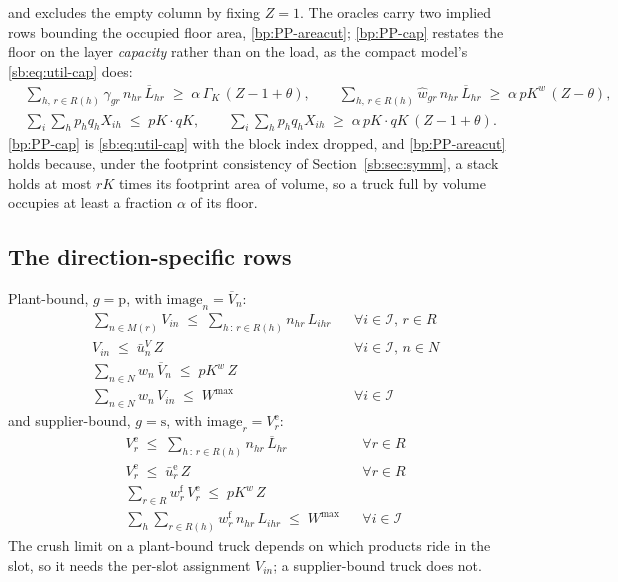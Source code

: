 and excludes the empty column by fixing $Z=1$. The oracles carry two
implied rows bounding the occupied floor area, \eqref{bp:PP-areacut};
\eqref{bp:PP-cap} restates the floor on the layer \emph{capacity}
rather than on the load, as the compact model's
\eqref{sb:eq:util-cap} does:
\begin{align}
  & \sum_{h,\,r \in R(h)} \gamma_{gr}\,n_{hr}\,\overline{L}_{hr}
      \;\ge\;\alpha\,\Gamma_{K}\,(Z-1+\theta), \qquad
    \sum_{h,\,r \in R(h)} \hat w_{gr}\,n_{hr}\,\overline{L}_{hr}
      \;\ge\;\alpha\,\mathit{pK}^{w}\,(Z-\theta),
    \label{bp:PP-cap}\\
  & \sum_{i}\sum_{h} p_{h}q_{h}X_{ih} \;\le\; \mathit{pK}\cdot\mathit{qK},
    \qquad
    \sum_{i}\sum_{h} p_{h}q_{h}X_{ih}
      \;\ge\;\alpha\,\mathit{pK}\cdot\mathit{qK}\,(Z-1+\theta).
    \label{bp:PP-areacut}
\end{align}
\eqref{bp:PP-cap} is \eqref{sb:eq:util-cap} with the block index
dropped, and \eqref{bp:PP-areacut} holds because, under the footprint
consistency of Section~\ref{sb:sec:symm}, a stack holds at most $rK$
times its footprint area of volume, so a truck full by volume occupies
at least a fraction $\alpha$ of its floor.

\subsection{The direction-specific rows}
\label{sec:pp-dir}

Plant-bound, $g=\mathrm{p}$, with $\mathrm{image}_{n}=\overline{V}_{n}$:
\begin{align}
  & \sum_{n \in M(r)} V_{in} \;\le\; \sum_{h\,:\,r \in R(h)} n_{hr}\,L_{ihr}
    && \forall i \in \mathcal{I},\, r \in R \label{bp:PP-p-slot-cap}\\
  & V_{in} \;\le\; \bar u^{V}_{n}\,Z
    && \forall i \in \mathcal{I},\, n \in N \label{bp:PP-p-slot-link}\\
  & \sum_{n \in N} w_{n}\,\overline{V}_{n} \;\le\; \mathit{pK}^{w}\,Z
    \label{bp:PP-p-truck-w}\\
  & \sum_{n \in N} w_{n}\,V_{in} \;\le\; W^{\max}
    && \forall i \in \mathcal{I} \label{bp:PP-p-stack-w}
\end{align}
and supplier-bound, $g=\mathrm{s}$, with
$\mathrm{image}_{r}=V^{\mathrm{e}}_{r}$:
\begin{align}
  & V^{\mathrm{e}}_{r} \;\le\; \sum_{h\,:\,r \in R(h)} n_{hr}\,\overline{L}_{hr}
    && \forall r \in R \label{bp:PP-s-empty-cap}\\
  & V^{\mathrm{e}}_{r} \;\le\; \bar u^{\mathrm{e}}_{r}\,Z
    && \forall r \in R \label{bp:PP-s-empty-link}\\
  & \sum_{r \in R} w^{\mathrm{f}}_{r}\,V^{\mathrm{e}}_{r}
      \;\le\; \mathit{pK}^{w}\,Z \label{bp:PP-s-truck-w}\\
  & \sum_{h}\sum_{r \in R(h)} w^{\mathrm{f}}_{r}\,n_{hr}\,L_{ihr}
      \;\le\; W^{\max}
    && \forall i \in \mathcal{I} \label{bp:PP-s-stack-w}
\end{align}
The crush limit on a plant-bound truck depends on which products ride
in the slot, so it needs the per-slot assignment $V_{in}$; a
supplier-bound truck does not.

